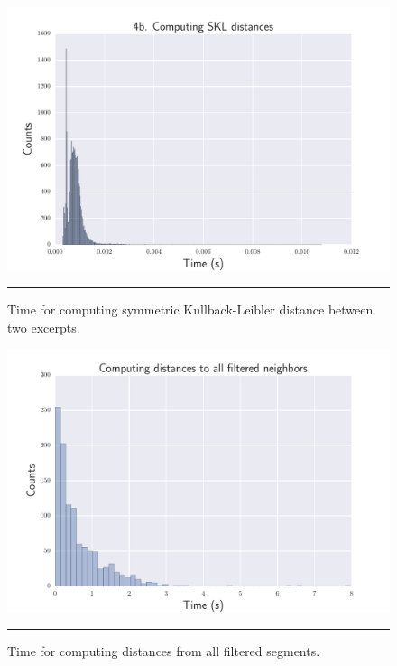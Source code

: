 \begin{figure}[h]
\begin{center}
\includegraphics[scale=0.7]{Figures/bench_skl.pdf}
    \rule{10em}{0.5pt}
  \caption[Time for computing symmetric Kullback-Leibler distance]{Time for computing symmetric Kullback-Leibler distance between two excerpts.}
  \label{fig:step5}
\end{center}
\end{figure}

\begin{figure}[h]
\begin{center}
\includegraphics[scale=0.7]{Figures/bench_get_suitsegm.pdf}
    \rule{10em}{0.5pt}
  \caption[Time for computing distances from all filtered segments]{Time for computing distances from all filtered segments.}
  \label{fig:step6}
\end{center}
\end{figure}


